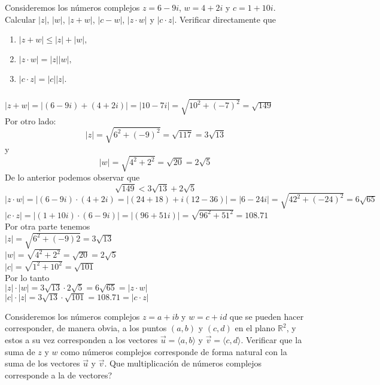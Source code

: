\documentclass[twoside]{book}
\begin{document}
\begin{example}{}
    Consideremos los n\'umeros complejos $z=6-9i$, $w=4+2i$ y $c=1+10i$. Calcular $|z|$, $|w|$, $|z+w|$, $|c-w|$, $|z\cdot w|$ y $|c\cdot z|$. Verificar directamente que
    \begin{multicols}{3}
        \begin{enumerate}[label=\alph*).]
            \item $|z+w|\leq|z|+|w|,$
            \item $|z\cdot w|=|z||w|,$
            \item $|c\cdot z|=|c||z|.$
        \end{enumerate}
    \end{multicols}

\end{example}
\begin{sol}
    \begin{solucion}{}
        $\phantom{g}$\\
        $|z+w|=|(6-9i)+(4+2i)|=|10-7i|=\sqrt{10^2+(-7)^2}=\sqrt{149}$\\
        Por otro lado:
        $$|z|=\sqrt{6^2+(-9)^2}=\sqrt{117}=3\sqrt{13}$$
        y
        $$|w|=\sqrt{4^2+2^2}=\sqrt{20}=2\sqrt{5}$$
        De lo anterior podemos observar que\\
        $$\sqrt{149}<3\sqrt{13}+2\sqrt{5}$$
        $|z\cdot w|=|(6-9i)\cdot (4+2i)=|(24+18)+i(12-36)|=|6-24i|=\sqrt{42^2+(-24)^2}=6\sqrt{65}$\\
        $|c\cdot z|=|(1+10i)\cdot (6-9i)|=|(96+51i)|=\sqrt{96^2+51^2}=108.71$\\
        Por otra parte tenemos\\
        $|z|=\sqrt{6^2+(-9)2}=3\sqrt{13}$\\
        $|w|=\sqrt{4^2+2^2}=\sqrt{20}=2\sqrt{5}$\\
        $|c|=\sqrt{1^2+10^2}=\sqrt{101}$\\
        Por lo tanto\\
        $|z|\cdot |w|=3\sqrt{13}\cdot 2\sqrt{5}=6\sqrt{65}=|z\cdot w|$\\
        $|c|\cdot |z|=3\sqrt{13}\cdot \sqrt{101}=108.71=|c\cdot z|$
    \end{solucion}
\end{sol}
\begin{example}{}
    Consideremos los n\'umeros complejos $z=a+ib$ y $w=c+id$ que se pueden hacer corresponder, de manera obvia, a los puntos $(a,b)$ y $(c,d)$ en el plano $\mathbb{R}^2$, y estos a su vez corresponden a los vectores $\vec{u}=\langle a,b \rangle$ y $\vec{v}=\langle c,d \rangle$. Verificar que la suma de $z$ y $w$ como n\'umeros complejos corresponde de forma natural con la suma de los vectores $\vec{u}$ y $\vec{v}$. \textquestiondown Que multiplicaci\'on de n\'umeros complejos corresponde a la de vectores?

\end{example}
\end{document}
